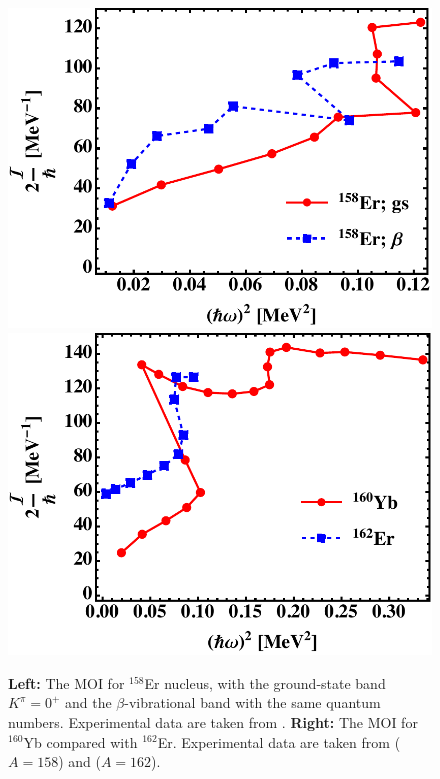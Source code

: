 \begin{figure}
    \centering
    \includegraphics[scale=0.5]{Chapters/Figures/mois_Er158.pdf}
    \includegraphics[scale=0.5]{Chapters/Figures/mois_Yb160Er182.pdf}
    \caption{\textbf{Left:} The MOI for $^{158}$Er nucleus, with the ground-state band $K^\pi=0^+$ and the $\beta$-vibrational band with the same quantum numbers. Experimental data are taken from \cite{nica2017nuclear}. \textbf{Right:} The MOI for $^{160}$Yb compared with $^{162}$Er. Experimental data are taken from \cite{nica2021nuclear} ($A=158$) and \cite{reich2007nuclear} ($A=162$).}
    \label{fig-ErYbnuclei-mois}
\end{figure}

